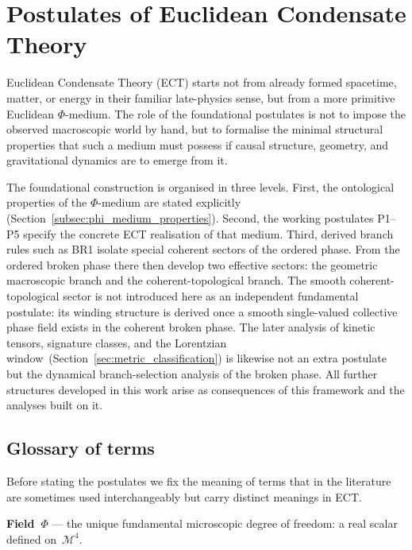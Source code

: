 \documentclass[11pt,a4paper]{article}
\numberwithin{equation}{section}
\begin{document}
\section{Postulates of Euclidean Condensate Theory}
\label{sec:postulates}

Euclidean Condensate Theory (ECT) starts not from already formed
spacetime, matter, or energy in their familiar late-physics sense,
but from a more primitive Euclidean $\Phi$-medium.
The role of the foundational postulates is not to impose
the observed macroscopic world by hand, but to formalise the minimal
structural properties that such a medium must possess if causal
structure, geometry, and gravitational dynamics are to emerge from it.

The foundational construction is organised in three levels.
First, the ontological properties of the $\Phi$-medium are stated
explicitly (Section~\ref{subsec:phi_medium_properties}).
Second, the working postulates P1--P5 specify the concrete ECT
realisation of that medium.
Third, derived branch rules such as BR1 isolate special coherent sectors
of the ordered phase.
From the ordered broken phase there then develop two effective sectors:
the geometric macroscopic branch and the coherent-topological branch.
The smooth coherent-topological sector is not introduced here as an
independent fundamental postulate: its winding structure is derived once
a smooth single-valued collective phase field exists in the coherent
broken phase.
The later analysis of kinetic tensors, signature classes, and the
Lorentzian window~(Section~\ref{sec:metric_classification}) is likewise
not an extra postulate but the dynamical branch-selection analysis of
the broken phase.
All further structures developed in this work arise as consequences
of this framework and the analyses built on it.

\subsection{Glossary of terms}
\label{subsec:glossary}

Before stating the postulates we fix the meaning of terms that
in the literature are sometimes used interchangeably but carry
distinct meanings in ECT.

\medskip
\noindent\textbf{Field~$\Phi$} --- the unique fundamental
microscopic degree of freedom: a real scalar defined on~$\mathcal{M}^4$.
\end{document}
